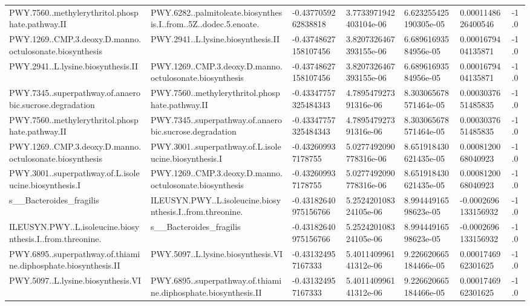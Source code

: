\begin{longtable}{lllllll}
PWY.7560..methylerythritol.phosphate.pathway.II & PWY.6282..palmitoleate.biosynthesis.I..from..5Z..dodec.5.enoate. & -0.4377059262838818 & 3.7733971942403104e-06 & 6.623255425190305e-05 & 0.0001148626400546 & -1.0 \\
PWY.1269..CMP.3.deoxy.D.manno.octulosonate.biosynthesis & PWY.2941..L.lysine.biosynthesis.II & -0.43748627158107456 & 3.8207326467393155e-06 & 6.68961693584956e-05 & 0.0001679404135871 & -1.0 \\
PWY.2941..L.lysine.biosynthesis.II & PWY.1269..CMP.3.deoxy.D.manno.octulosonate.biosynthesis & -0.43748627158107456 & 3.8207326467393155e-06 & 6.68961693584956e-05 & 0.0001679404135871 & -1.0 \\
PWY.7345..superpathway.of.anaerobic.sucrose.degradation & PWY.7560..methylerythritol.phosphate.pathway.II & -0.43347757325484343 & 4.789547927391316e-06 & 8.303065678571464e-05 & 0.0003037651485835 & -1.0 \\
PWY.7560..methylerythritol.phosphate.pathway.II & PWY.7345..superpathway.of.anaerobic.sucrose.degradation & -0.43347757325484343 & 4.789547927391316e-06 & 8.303065678571464e-05 & 0.0003037651485835 & -1.0 \\
PWY.1269..CMP.3.deoxy.D.manno.octulosonate.biosynthesis & PWY.3001..superpathway.of.L.isoleucine.biosynthesis.I & -0.432609937178755 & 5.0277492090778316e-06 & 8.651918430621435e-05 & 0.0008120068040923 & -1.0 \\
PWY.3001..superpathway.of.L.isoleucine.biosynthesis.I & PWY.1269..CMP.3.deoxy.D.manno.octulosonate.biosynthesis & -0.432609937178755 & 5.0277492090778316e-06 & 8.651918430621435e-05 & 0.0008120068040923 & -1.0 \\
s\_\_Bacteroides\_fragilis & ILEUSYN.PWY..L.isoleucine.biosynthesis.I..from.threonine. & -0.43182640975156766 & 5.252420108324105e-06 & 8.99444916598623e-05 & -0.0002696133156932 & -1.0 \\
ILEUSYN.PWY..L.isoleucine.biosynthesis.I..from.threonine. & s\_\_Bacteroides\_fragilis & -0.43182640975156766 & 5.252420108324105e-06 & 8.99444916598623e-05 & -0.0002696133156932 & -1.0 \\
PWY.6895..superpathway.of.thiamine.diphosphate.biosynthesis.II & PWY.5097..L.lysine.biosynthesis.VI & -0.431324957167333 & 5.401140996141312e-06 & 9.226620665184466e-05 & 0.0001746962301625 & -1.0 \\
PWY.5097..L.lysine.biosynthesis.VI & PWY.6895..superpathway.of.thiamine.diphosphate.biosynthesis.II & -0.431324957167333 & 5.401140996141312e-06 & 9.226620665184466e-05 & 0.0001746962301625 & -1.0 \\

\end{longtable}
